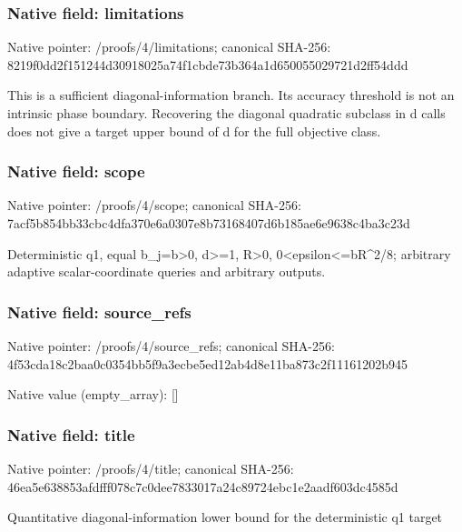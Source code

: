 \documentclass[10pt,a4paper]{article}
\begin{document}
\subsubsection{Native field: limitations}
Native pointer: /proofs/4/limitations; canonical SHA-256: 8219f0dd2f151244d30918025a74f1cbde73b364a1d650055029721d2ff54ddd

\begingroup\raggedright\sloppy This is a sufficient diagonal-information branch. Its accuracy threshold is not an intrinsic phase boundary. Recovering the diagonal quadratic subclass in d calls does not give a target upper bound of d for the full objective class.\par\endgroup

\subsubsection{Native field: scope}
Native pointer: /proofs/4/scope; canonical SHA-256: 7acf5b854bb33cbc4dfa370e6a0307e8b73168407d6b185ae6e9638c4ba3c23d

\begingroup\raggedright\sloppy Deterministic q1,\allowbreak{} equal b\_\allowbreak{}j=\allowbreak{}b>0,\allowbreak{} d>=\allowbreak{}1,\allowbreak{} R>0,\allowbreak{} 0<epsilon<=\allowbreak{}bR\textasciicircum{}2/\allowbreak{}8;\allowbreak{} arbitrary adaptive scalar-coordinate queries and arbitrary outputs.\par\endgroup

\subsubsection{Native field: source\_\allowbreak{}refs}
Native pointer: /proofs/4/source\_\allowbreak{}refs; canonical SHA-256: 4f53cda18c2baa0c0354bb5f9a3ecbe5ed12ab4d8e11ba873c2f11161202b945

Native value (empty\_\allowbreak{}array): []

\subsubsection{Native field: title}
Native pointer: /proofs/4/title; canonical SHA-256: 46ea5e638853afdfff078c7c0dee7833017a24c89724ebc1e2aadf603dc4585d

\begingroup\raggedright\sloppy Quantitative diagonal-information lower bound for the deterministic q1 target\par\endgroup
\end{document}
